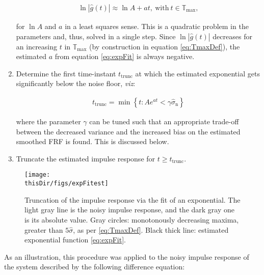 \begin{enumerate}
\begin{align}\label{eq:expFit}
\ln \left|\hat g(t)\right|\approx \ln A+at,\ \mathrm{with}\ t\in\mathbb{T}_\mathrm{max},
\end{align}

\noindent
for $\ln A$ and $a$ in a least squares sense. This is a quadratic problem in the parameters and, thus, solved in a single step. Since  $\ln \left|\hat g(t)\right|$ decreases for an increasing $t$ in $\mathbb{T}_\mathrm{max}$ (by construction in equation \eqref{eq:TmaxDef}), the estimated $a$ from equation \eqref{eq:expFit} is always negative.

\item
Determine the first time-instant $t_\mathrm{trunc}$ at which the estimated exponential gets significantly below the noise floor, \emph{viz}:

\begin{align}\label{eq:truncTimeExpFit}
t_\mathrm{trunc} = \min \left\{t:Ae^{at} < \gamma\hat\sigma_\mathrm{n}\right\}
\end{align}

\noindent
where the parameter $\gamma$ can be tuned such that an appropriate trade-off between the decreased variance and the increased bias on the estimated smoothed FRF is found. This is discussed below. %

\item
 Truncate the estimated impulse response for $t \geqslant t_\mathrm{trunc}$.

\end{enumerate}

\begin{figure}[tbh] %
\centering

\texttt{[image: \\thisDir/figs/expFitest]}
\caption{Truncation of the impulse response via the fit of  an exponential. The light gray line is the noisy impulse response, and the dark gray one is its absolute value. Gray circles: monotonously decreasing maxima, greater than $5\hat\sigma$, as per \eqref{eq:TmaxDef}. Black thick line: estimated exponential function \eqref{eq:expFit}.}
\label{FRF_truncate_expfitter}
\end{figure}

As an illustration, this procedure was applied to the noisy impulse response of the system described by the following difference equation:


